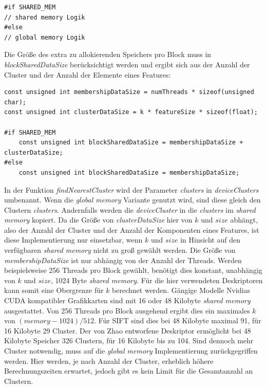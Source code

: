 \begin{lstlisting}[style=CUDA]
#if SHARED_MEM
// shared memory Logik
#else
// global memory Logik
\end{lstlisting}

Die Größe des extra zu allokierenden Speichers pro Block muss in \textit{blockSharedDataSize} berücksichtigt werden und ergibt sich aus der Anzahl der Cluster und der Anzahl der Elemente eines Features:

\begin{lstlisting}[style=CUDA]
const unsigned int membershipDataSize = numThreads * sizeof(unsigned char);
const unsigned int clusterDataSize = k * featureSize * sizeof(float);

#if SHARED_MEM
    const unsigned int blockSharedDataSize = membershipDataSize + clusterDataSize;
#else
	const unsigned int blockSharedDataSize = membershipDataSize;
\end{lstlisting}

In der Funktion \textit{findNearestCluster} wird der Parameter \textit{clusters} in \textit{deviceClusters} umbenannt. Wenn die \textit{global memory} Variante genutzt wird, sind diese gleich den Clustern \textit{clusters}. Andernfalls werden die \textit{deviceCluster} in die \textit{clusters} im \textit{shared memory} kopiert.
Da die Größe von \textit{clusterDataSize} hier von $k$ und $size$ abhängt, also der Anzahl der Cluster und der Anzahl der Komponenten eines Features, ist diese Implementierung nur einsetzbar, wenn $k$ und $size$ in Hinsicht auf den verfügbaren \textit{shared memory} nicht zu groß gewählt werden. Die Größe von \textit{membershipDataSize} ist nur abhängig von der Anzahl der Threads. Werden beispielsweise 256 Threads pro Block gewählt, benötigt dies konstant, unabhängig von $k$ und $size$, 1024 Byte \textit{shared memory}. Für die hier verwendeten Deskriptoren kann somit eine Obergrenze für $k$ berechnet werden. Gängige Modelle Nvidias CUDA kompatibler Grafikkarten sind mit 16 oder 48 Kilobyte \textit{shared memory} ausgestattet. Von 256 Threads pro Block ausgehend ergibt dies ein maximales $k$ von $(memory - 1024) / 512$. Für SIFT sind dies bei 48 Kilobyte maximal 91, für 16 Kilobyte 29 Cluster. Der von Zhao entworfene Deskriptor ermöglicht bei 48 Kilobyte Speicher 326 Clustern, für 16 Kilobyte bis zu 104. Sind dennoch mehr Cluster notwendig, muss auf die \textit{global memory} Implementierung zurückgegriffen werden. Hier werden, je nach Anzahl der Cluster, erheblich höhere Berechnungszeiten erwartet, jedoch gibt es kein Limit für die Gesamtanzahl an Clustern.